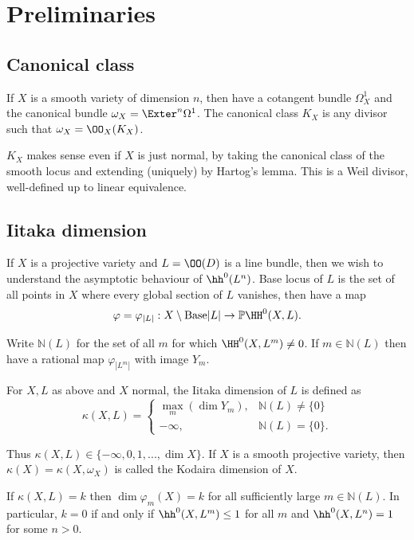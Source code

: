\section{Preliminaries}
\subsection{Canonical class} If \(X\) is a smooth variety of dimension \(n\),
then have a cotangent bundle \(\Omega^1_X\) and the canonical bundle
\(\omega_X=\Exter^n\Omega^1\). The canonical class \(K_X\) is any divisor such
that \(\omega_X=\OO_X(K_X)\).

\(K_X\) makes sense even if \(X\) is just normal, by taking the canonical class
of the smooth locus and extending (uniquely) by Hartog's lemma. This is a Weil
divisor, well-defined up to linear equivalence.

\subsection{Iitaka dimension} If \(X\) is a projective variety and \(L=\OO(D)\)
is a line bundle, then we wish to understand the asymptotic behaviour of
\(\hh^0(L^n)\). Base locus of \(L\) is the set of all points in \(X\) where
every global section of \(L\) vanishes, then have a map
\[
    \varphi =\varphi_{|L|}:X\setminus\text{Base}|L| \to
    \mathbb{P}\HH^0(X,L).
\]

Write \(\mathbb{N}(L)\) for the set of all \(m\) for which \(\HH^0(X,L^m)\neq
0\). If \(m\in \mathbb{N}(L)\) then have a rational map \(\varphi_{|L^m|}\) with
image \(Y_m\).

\begin{definition}
For \(X,L\) as above and \(X\) normal, the Iitaka dimension of \(L\) is defined
as
\[\kappa(X,L)=\begin{cases}
\max_m(\dim Y_m), &\mathbb{N}(L)\neq \{0\}\\
-\infty, &\mathbb{N}(L)=\{0\}.
\end{cases}\]

Thus \(\kappa(X,L)\in \{-\infty, 0,1,...,\dim X\}\). If \(X\) is a smooth
projective variety, then \(\kappa(X)=\kappa(X,\omega_X)\) is called the Kodaira
dimension of \(X\).
\end{definition}

\begin{remark}
If \(\kappa(X,L)=k\) then \(\dim\varphi_m(X)=k\) for all sufficiently large
\(m\in \mathbb{N}(L)\). In particular, \(k=0\) if and only if \(\hh^0(X,L^m)\leq
1\) for all \(m\) and \(\hh^0(X,L^n)=1\) for some \(n>0\).
\end{remark}

